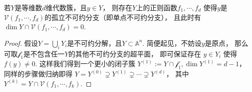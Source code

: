     \begin{lemma}
        若$Y$是等维数$d$维代数簇，且$y \in Y$，
        则存在$Y$上的正则函数$f_{1},\cdots,f_{d}$
        使得$y$是$\mathcal{V}(f_{1},\cdots,f_{d})$的孤立不可约分支（即单点不可约分支），
        且此时有$\dim Y\cap\mathcal{V}(f_{1},\cdots,f_{d}) = 0$.
    \end{lemma}
    \begin{proof}
        假设$Y=\bigcup_{i} Y_{i}$是不可约分解，且$Y \subset \mathbb{A}^{n}$.
        简便起见，不妨设$y$是原点，
        那么可取$\mathcal{f_{1}}$是不包含任一$Y$的其他不可约分支的超平面，
        即可保证存在 $y\in Y_{i}$ 使得 $f(y)\neq 0$. 
        这样我们得到一个更小的闭子簇 
        $Y^{(1)}:=Y\cap \mathcal{f_{1}},\dim Y^{(1)}=d-1$，同样的步骤做归纳即得
        $Y=Y^{(0)}\supsetneq Y^{(1)}\supsetneq \cdots \supsetneq Y^{(d)}$，
        其中$ Y^{(k)}=Y\cap \mathcal{V}(f_{1},\cdots,f_{k})$.
    \end{proof}

